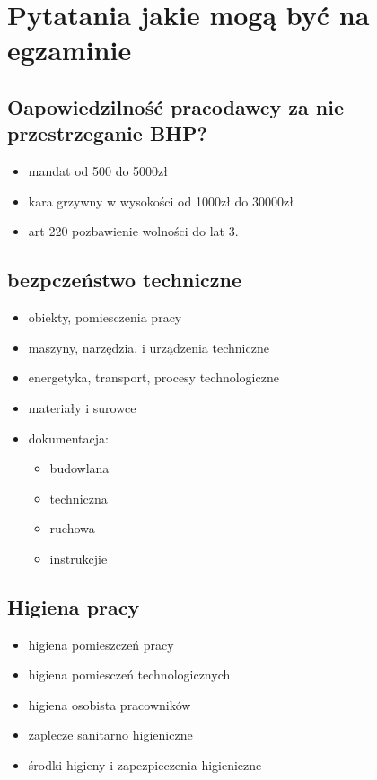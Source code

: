 \documentclass[11pt]{article}
\date{\today}
\title{}
\begin{document}
\tableofcontents

\section{Pytatania jakie mogą być na egzaminie}
\label{sec:orge38e1eb}
\subsection{Oapowiedzilność pracodawcy za nie przestrzeganie BHP?}
\label{sec:org0e6069f}
\begin{itemize}
\item mandat od 500 do 5000zł
\item kara grzywny w wysokości od 1000zł do 30000zł
\item art 220 pozbawienie wolności do lat 3.
\end{itemize}
\subsection{bezpczeństwo techniczne}
\label{sec:orgc7b4931}
\begin{itemize}
\item obiekty, pomiesczenia pracy
\item maszyny, narzędzia, i urządzenia techniczne
\item energetyka, transport, procesy technologiczne
\item materiały i surowce
\item dokumentacja:
\begin{itemize}
\item budowlana
\item techniczna
\item ruchowa
\item instrukcjie
\end{itemize}
\end{itemize}
\subsection{Higiena pracy}
\label{sec:org87cc9ea}
\begin{itemize}
\item higiena pomieszczeń pracy
\item higiena pomiesczeń technologicznych
\item higiena osobista pracowników
\item zaplecze sanitarno higieniczne
\item środki higieny i zapezpieczenia higieniczne
\end{itemize}
\end{document}
